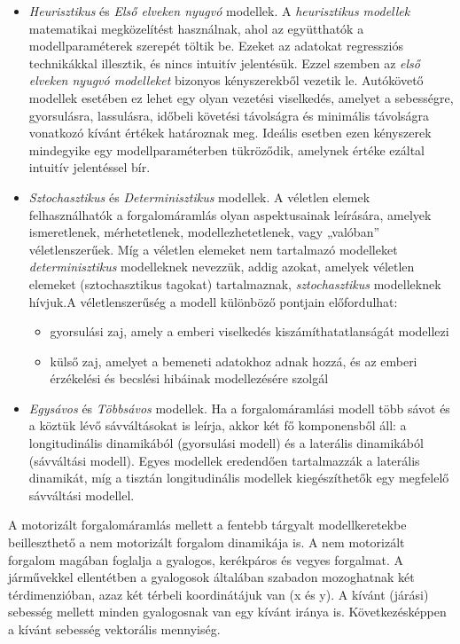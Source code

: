 \documentclass[14pt,a4paper]{extarticle}
\begin{document}
\begin{itemize}
	\item \textit{Heurisztikus} és \textit{Első elveken nyugvó} modellek.  A \textit{heurisztikus modellek} matematikai megközelítést használnak, ahol az együtthatók a modellparaméterek szerepét töltik be. Ezeket az adatokat regressziós technikákkal illesztik, és nincs intuitív jelentésük. Ezzel szemben az \textit{első elveken nyugvó modelleket} bizonyos kényszerekből vezetik le. Autókövető modellek esetében ez lehet egy olyan vezetési viselkedés, amelyet a sebességre, gyorsulásra, lassulásra, időbeli követési távolságra és minimális távolságra vonatkozó kívánt értékek határoznak meg. Ideális esetben ezen kényszerek mindegyike egy modellparaméterben tükröződik, amelynek értéke ezáltal intuitív jelentéssel bír.
	\item \textit{Sztochasztikus} és \textit{Determinisztikus} modellek. A véletlen elemek felhasználhatók a forgalomáramlás olyan aspektusainak leírására, amelyek ismeretlenek, mérhetetlenek, modellezhetetlenek, vagy „valóban” véletlenszerűek. Míg a véletlen elemeket nem tartalmazó modelleket \textit{determinisztikus} modelleknek nevezzük, addig azokat, amelyek véletlen elemeket (sztochasztikus tagokat) tartalmaznak, \textit{sztochasztikus} modelleknek hívjuk.A véletlenszerűség a modell különböző pontjain előfordulhat:
	\begin{itemize}
		\item gyorsulási zaj, amely a emberi viselkedés kiszámíthatatlanságát modellezi
		\item külső zaj, amelyet a bemeneti adatokhoz adnak hozzá, és az emberi érzékelési és becslési hibáinak modellezésére szolgál 
	\end{itemize}
	\item \textit{Egysávos} és \textit{Többsávos} modellek. Ha a forgalomáramlási modell több sávot és a köztük lévő sávváltásokat is leírja, akkor két fő komponensből áll: a longitudinális dinamikából (gyorsulási modell) és a laterális dinamikából (sávváltási modell). Egyes modellek eredendően tartalmazzák a laterális dinamikát, míg a tisztán longitudinális modellek kiegészíthetők egy megfelelő sávváltási modellel.
\end{itemize}
A motorizált forgalomáramlás mellett a fentebb tárgyalt modellkeretekbe beilleszthető a nem motorizált forgalom dinamikája is. A nem motorizált forgalom magában foglalja a gyalogos, kerékpáros és vegyes forgalmat.  A járművekkel ellentétben a gyalogosok általában szabadon mozoghatnak két térdimenzióban, azaz két térbeli koordinátájuk van (x és y). A kívánt (járási) sebesség mellett minden gyalogosnak van egy kívánt iránya is. Következésképpen a kívánt sebesség vektorális mennyiség.
\end{document}
